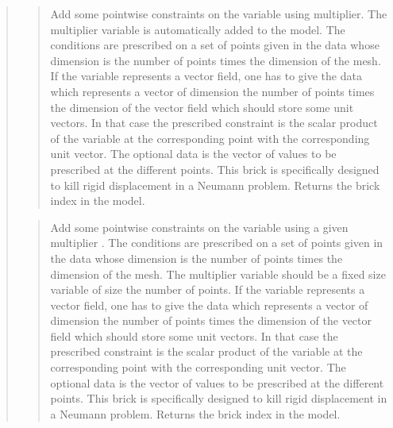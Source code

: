 \documentclass[a4paper,11pt,english]{sphinxmanual}
\begin{document}
\begin{quote}
\begin{quote}
Add some pointwise constraints on the variable  using
multiplier. The multiplier variable is automatically added to the model.
The conditions are prescribed on a set of points given in the data
 whose dimension is the number of points times the dimension
of the mesh.
If the variable represents a vector field, one has to give the data
 which represents a vector of dimension the number of
points times the dimension of the vector field which should store some
unit vectors. In that case the prescribed constraint is the scalar
product of the variable at the corresponding point with the corresponding
unit vector.
The optional data  is the vector of values to be prescribed
at the different points.
This brick is specifically designed to kill rigid displacement
in a Neumann problem.
Returns the brick index in the model.
\end{quote}

\begin{quote}

Add some pointwise constraints on the variable  using a given
multiplier .
The conditions are prescribed on a set of points given in the data
 whose dimension is the number of points times the dimension
of the mesh.
The multiplier variable should be a fixed size variable of size the
number of points.
If the variable represents a vector field, one has to give the data
 which represents a vector of dimension the number of
points times the dimension of the vector field which should store some
unit vectors. In that case the prescribed constraint is the scalar
product of the variable at the corresponding point with the corresponding
unit vector.
The optional data  is the vector of values to be prescribed
at the different points.
This brick is specifically designed to kill rigid displacement
in a Neumann problem.
Returns the brick index in the model.
\end{quote}

\begin{quote}


\end{quote}
\end{quote}
\end{document}
